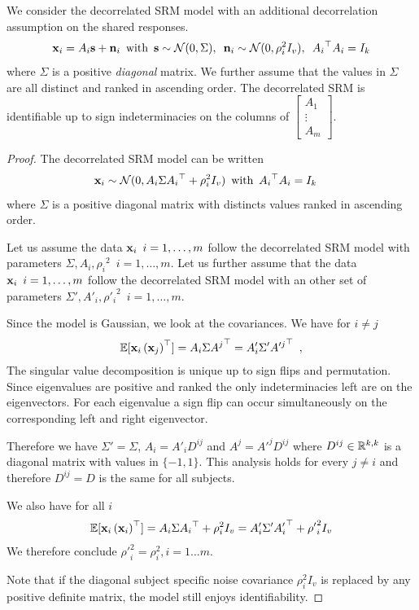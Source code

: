 \documentclass{report}
\begin{document}
\begin{proposition}
We consider the decorrelated SRM model with an additional decorrelation assumption on the shared responses.
\begin{align*}
\mathbf{x}_i = A_i \mathbf{s} + \mathbf{n}_i \enspace \text{with} \enspace \mathbf{s} \sim \mathcal{N}(0, \Sigma), \enspace\mathbf{n}_i \sim \mathcal{N}(0, \rho_i^2 I_v), \enspace {A_i}^{\top}A_i = I_k
\end{align*}
where $\Sigma$ is a positive \emph{diagonal} matrix. We further assume that the values in $\Sigma$ are all distinct and ranked in ascending order.
The decorrelated SRM is identifiable up to sign indeterminacies on the columns of 
$\begin{bmatrix}
A_1 \\
\vdots \\
A_m
\end{bmatrix}
$.
\end{proposition}
\begin{proof}
The decorrelated SRM model can be written
\begin{align*}
    &\mathbf{x}_i \sim \mathcal{N}(0, A_i \Sigma {A_i}^{\top} + \rho_i^2 I_v) \enspace \text{with}\enspace  {A_i}^{\top}A_i = I_k
\end{align*}
where $\Sigma$ is a positive diagonal matrix with distincts values ranked in ascending order.

Let us assume the data $\mathbf{x}_i \enspace i=1, \dots, m$ follow the decorrelated SRM model with parameters $\Sigma, A_i, {\rho_i}^2 \enspace i=1, \dots, m$. Let us further assume that the data $\mathbf{x}_i \enspace i=1, \dots, m$ follow the decorrelated SRM model with an other set of parameters $\Sigma', A'_i, {\rho'_i}^2 \enspace i=1, \dots, m$.

Since the model is Gaussian, we look at the covariances.
We have for $i \neq j$
\begin{align*}
    \mathbb{E}[\mathbf{x}_i\left(\mathbf{x}_j\right)^{\top}] = A_i\Sigma {A^j}^{\top} = A'_i \Sigma'{A'^j}^{\top} \enspace, 
\end{align*}
The singular value decomposition is unique up to sign flips and permutation. Since eigenvalues are positive and ranked the only indeterminacies left are on the eigenvectors. For each eigenvalue a sign flip can occur simultaneously on the corresponding left and right eigenvector.

Therefore we have $\Sigma' = \Sigma$, $A_i = A'_i D^{ij}$ and $A^j = A'^j D^{ij}$ where $D^{ij} \in \mathbb{R}^{k, k}$ is a diagonal matrix with values in $\{-1, 1\}$. This analysis holds for every $j \neq i$ and therefore $D^{ij} = D$ is the same for all subjects.

We also have for all $i$
\begin{align*}
    \mathbb{E}[\mathbf{x}_i \left(\mathbf{x}_i\right)^{\top}] = A_i \Sigma {A_i}^{\top} + \rho_i^2 I_v =  A'_i \Sigma' {A'_i}^{\top}  + {\rho'}_i^2 I_v\\
\end{align*}
We therefore conclude ${\rho'}_i^2 = \rho_i^2, i=1 \dots m$.

Note that if the diagonal subject specific noise covariance $\rho_i^2 I_v$ is replaced by any positive definite matrix, the model still enjoys identifiability.
\end{proof}
\end{document}
